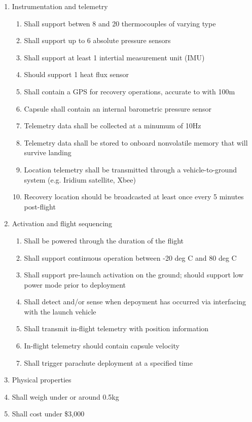\documentclass{article}
\begin{document}
\begin{enumerate}
\item Instrumentation and telemetry
  \begin{enumerate}
	  \item Shall support betwen 8 and 20 thermocouples of varying type
	  \item Shall support up to 6 absolute pressure sensors
	  \item Shall support at least 1 intertial measurement unit (IMU)
	  \item Should support 1 heat flux sensor
	  \item Shall contain a GPS for recovery operations, accurate to with 100m
	  \item Capsule shall contain an internal barometric pressure sensor 
	  \item Telemetry data shall be collected at a minumum of 10Hz
	  \item Telemetry data shall be stored to onboard nonvolatile memory that will survive landing
	  \item Location telemetry shall be transmitted through a vehicle-to-ground system (e.g. Iridium satellite, Xbee)
	  \item Recovery location should be broadcasted at least once every 5 minutes post-flight
  \end{enumerate}
\item Activation and flight sequencing
  \begin{enumerate}
	  \item Shall be powered through the duration of the flight
	  \item Shall support continuous operation between -20 deg C and 80 deg C
	  \item Shall support pre-launch activation on the ground; should support low power mode prior to deployment
	  \item Shall detect and/or sense when depoyment has occurred via interfacing with the launch vehicle
	  \item Shall transmit in-flight telemetry with position information
	  \item In-flight telemetry should contain capsule velocity 
	  \item Shall trigger parachute deployment at a specified time
  \end{enumerate}
\item Physical properties
\item Shall weigh under or around 0.5kg
\item Shall cost under \$3,000
\end{enumerate}
\end{document}
